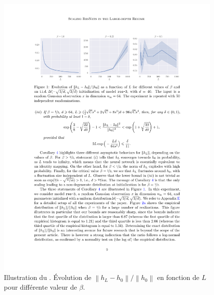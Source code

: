 \begin{figure}[H]
    \centering
    \includegraphics[width=.95\textwidth]{figs/figure_cor4.pdf}
    \caption{Illustration du . Évolution de $ \left\| h_L - h_0 \right\| / \left\| h_0 \right\| $ en fonction de $ L $ pour différente valeur de $ \beta  $.}
    \label{fig:cor4}
\end{figure}
